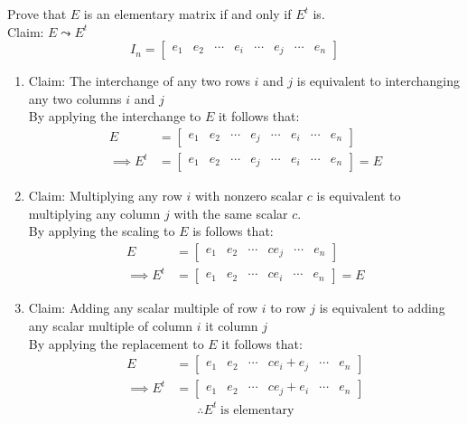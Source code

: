Prove that $E$ is an elementary matrix if and only if $E^t$ is.
\\Claim: $E \leadsto E^t$
\begin{equation}
I_n = \begin{bmatrix}e_1&e_2&\cdots&e_i&\cdots&e_j&\cdots&e_n\end{bmatrix}
\end{equation}
\begin{enumerate}
\item Claim: The interchange of any two rows $i$ and $j$ is equivalent
  to interchanging any two columns $i$ and $j$
\\By applying the interchange to $E$ it follows that:
\begin{align}
E &= \begin{bmatrix}e_1&e_2&\cdots& e_j & \cdots & e_i &
  \cdots&e_n\end{bmatrix} \\
\implies E^t &= \begin{bmatrix}e_1&e_2&\cdots& e_j & \cdots & e_i &
  \cdots&e_n\end{bmatrix} = E
\end{align}
\item Claim: Multiplying any row $i$ with nonzero scalar $c$ is equivalent to
  multiplying any column $j$ with the same scalar $c$.
\\By applying the scaling to $E$ is follows that:
\begin{align}
E
&=  \begin{bmatrix}e_1&e_2&\cdots&ce_j&\cdots&e_n\end{bmatrix}\\
\implies E^t
&= \begin{bmatrix}e_1&e_2&\cdots&ce_i&\cdots&e_n\end{bmatrix} = E
\end{align}
\item Claim: Adding any scalar multiple of row $i$ to row $j$ is equivalent
  to adding any scalar multiple of column $i$ it column $j$ 
\\By applying the replacement to $E$ it follows that:
\begin{align}
E &=  \begin{bmatrix}e_1&e_2&\cdots&ce_i +
  e_j&\cdots&e_n\end{bmatrix}\\
\implies E^t &= \begin{bmatrix}e_1&e_2&\cdots&ce_j+e_i&\cdots&e_n\end{bmatrix}
\end{align}
\begin{equation}
\therefore E^t\; \text{is elementary}
\end{equation}
\end{enumerate}
